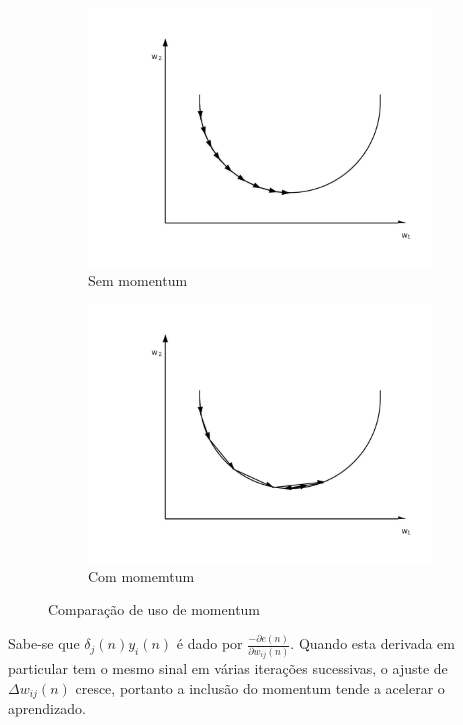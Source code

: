 \begin{figure}[H]
  \centering
  \begin{subfigure}[b]{0.4\linewidth}
    \includegraphics[width=\linewidth]{figuras/Sem_momentum.jpeg}
    \caption{Sem momentum}
  \end{subfigure}
  \begin{subfigure}[b]{0.4\linewidth}
    \includegraphics[width=\linewidth]{figuras/Com_momentum.jpeg}
    \caption{Com momemtum}
  \end{subfigure}
  \caption{Comparação de uso de momentum}
  \label{fig:coffee}
\end{figure}

Sabe-se que $\delta_j(n)y_i(n)$ é dado por $\frac{-\partial e(n)}{\partial w_{ij}(n)}$. Quando esta derivada em particular tem o mesmo sinal em várias iterações sucessivas, o ajuste de $\Delta w_{ij}(n)$ cresce, portanto a inclusão do momentum tende a acelerar o aprendizado.

